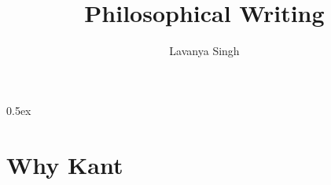 \documentclass[11pt,a4paper]{article}
\begin{document}
\title{Philosophical Writing}
\author{Lavanya Singh}
\maketitle
\tableofcontents


\newpage

\parindent 0pt\parskip 0.5ex


\newpage

\newpage 
\section{Why Kant}

\newpage 

\newpage



%

\end{document}
